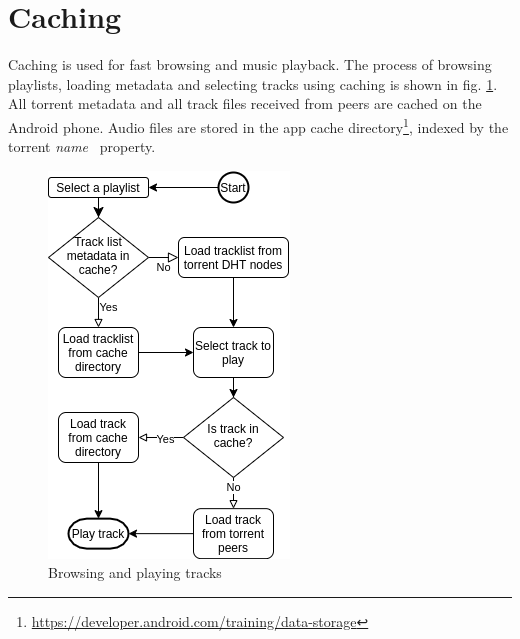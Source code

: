 \section{Caching}
Caching is used for fast browsing and music playback. The process of browsing playlists, loading metadata and selecting tracks using caching is shown in fig. \ref{fig:playing-tracks}. All torrent metadata and all track files received from peers are cached on the Android phone. Audio files are stored in the app cache directory\footnote{\url{https://developer.android.com/training/data-storage}}, indexed by the torrent \textit{name}~\citep{bittorrentbep3} property. 
\begin{figure}
        \includegraphics[width=1\linewidth]{implementation/playing_track.png}
        \caption{Browsing and playing tracks}
        \label{fig:playing-tracks}
    \endminipage
\end{figure}

